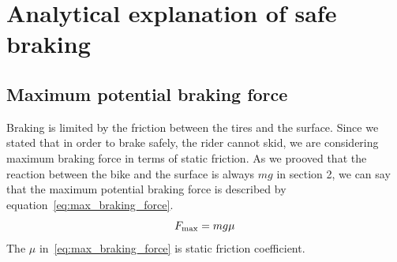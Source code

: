 \documentclass[12pt, a4]{article}
\begin{document}
\section{Analytical explanation of safe braking}\label{safe_braking}
\subsection{Maximum potential braking force}\label{safe_braking_max_force}
Braking is limited by the friction between the tires and the surface. Since we stated that in order to brake safely, the rider cannot
skid, we are considering maximum braking force in terms of static friction. As we prooved that the reaction between the bike and 
the surface is always $mg$ in section 2, we can say that the maximum potential braking force is described by equation~\eqref{eq:max_braking_force}. 
\begin{equation}
\centering%
\label{eq:max_braking_force}
F_{\max} = mg\mu
\end{equation}
The $\mu$ in~\eqref{eq:max_braking_force} is static friction coefficient.
\end{document}
